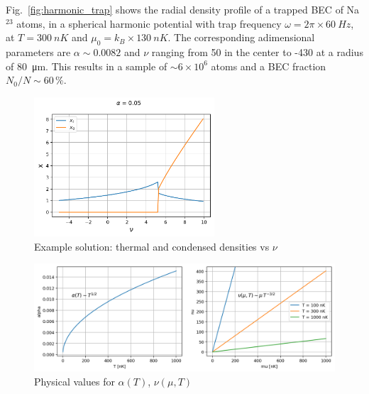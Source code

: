 \documentclass{article}
\begin{document}
Fig.~\ref{fig:harmonic_trap} shows the radial density profile of a trapped BEC of Na$^{23}$ atoms, in a spherical harmonic potential with trap frequency $\omega = 2 \pi \times \SI{60}{Hz}$, at $T = \SI{300}{nK}$ and $\mu_0 = k_B\times\SI{130}{nK}$. The corresponding adimensional parameters are $\alpha \sim 0.0082$ and $\nu$ ranging from 50 in the center to -430 at a radius of \SI{80}{\micro m}. This results in a sample of $\sim 6\times 10^6$ atoms and a BEC fraction $N_0/N \sim 60\,\%$.


\begin{figure}
  \centering
  \includegraphics[width=0.6\textwidth]{figures/fig_n_mu}
  \caption{Example solution: thermal and condensed densities vs $\nu$}
  \label{fig:solution}
\end{figure}

\begin{figure}
  \centering
  \includegraphics[width=\textwidth]{figures/fig_alpha_nu}
  \caption{Physical values for $\alpha(T)$, $\nu(\mu, T)$}
  \label{fig:alpha_nu}
\end{figure}
\end{document}

